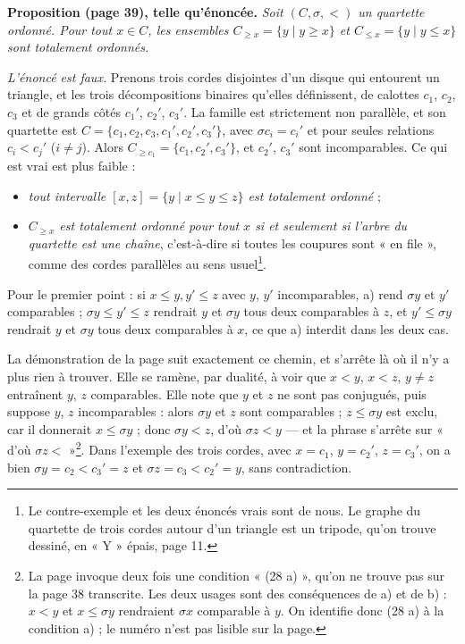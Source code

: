 \documentclass[11pt,a4paper]{article}
\begin{document}
\textbf{Proposition (page 39), telle qu'énoncée.} \emph{Soit $(C, \sigma, <)$
un quartette ordonné. Pour tout $x \in C$, les ensembles $C_{\geqslant x} =
\{y \mid y \geqslant x\}$ et $C_{\leqslant x} = \{y \mid y \leqslant x\}$
sont totalement ordonnés.}

\emph{L'énoncé est faux.} Prenons trois cordes disjointes d'un disque qui
entourent un triangle, et les trois décompositions binaires qu'elles
définissent, de calottes $c_1$, $c_2$, $c_3$ et de grands côtés $c_1'$,
$c_2'$, $c_3'$. La famille est strictement non parallèle, et son quartette
est $C = \{c_1, c_2, c_3, c_1', c_2', c_3'\}$, avec $\sigma c_i = c_i'$ et
pour seules relations $c_i < c_j'$ ($i \neq j$). Alors $C_{\geqslant c_1} =
\{c_1, c_2', c_3'\}$, et $c_2'$, $c_3'$ sont incomparables. Ce qui est vrai
est plus faible :
\begin{itemize}
  \item \emph{tout intervalle $[x, z] = \{y \mid x \leqslant y \leqslant z\}$
  est totalement ordonné} ;
  \item \emph{$C_{\geqslant x}$ est totalement ordonné pour tout $x$ si et
  seulement si l'arbre du quartette est une chaîne}, c'est-à-dire si toutes
  les coupures sont « en file », comme des cordes parallèles au sens usuel\footnote{Le
  contre-exemple et les deux énoncés vrais sont de nous. Le graphe du
  quartette de trois cordes autour d'un triangle est un tripode, qu'on
  trouve dessiné, en « Y » épais, page 11.}.
\end{itemize}
Pour le premier point : si $x \leqslant y, y' \leqslant z$ avec $y$, $y'$
incomparables, a) rend $\sigma y$ et $y'$ comparables ; $\sigma y \leqslant
y' \leqslant z$ rendrait $y$ et $\sigma y$ tous deux comparables à $z$, et
$y' \leqslant \sigma y$ rendrait $y$ et $\sigma y$ tous deux comparables à
$x$, ce que a) interdit dans les deux cas.

La démonstration de la page suit exactement ce chemin, et s'arrête là où il
n'y a plus rien à trouver. Elle se ramène, par dualité, à voir que $x < y$,
$x < z$, $y \neq z$ entraînent $y$, $z$ comparables. Elle note que $y$ et $z$
ne sont pas conjugués, puis suppose $y$, $z$ incomparables : alors $\sigma y$
et $z$ sont comparables ; $z \leqslant \sigma y$ est exclu, car il donnerait
$x \leqslant \sigma y$ ; donc $\sigma y < z$, d'où $\sigma z < y$ --- et la
phrase s'arrête sur « d'où $\sigma z <$ »\footnote{La page invoque deux fois
une condition « (28 a) », qu'on ne trouve pas sur la page 38 transcrite. Les
deux usages sont des conséquences de a) et de b) : $x < y$ et $x \leqslant
\sigma y$ rendraient $\sigma x$ comparable à $y$. On identifie donc (28 a) à
la condition a) ; le numéro n'est pas lisible sur la page.}. Dans l'exemple
des trois cordes, avec $x = c_1$, $y = c_2'$, $z = c_3'$, on a bien $\sigma y
= c_2 < c_3' = z$ et $\sigma z = c_3 < c_2' = y$, sans contradiction.
\end{document}
